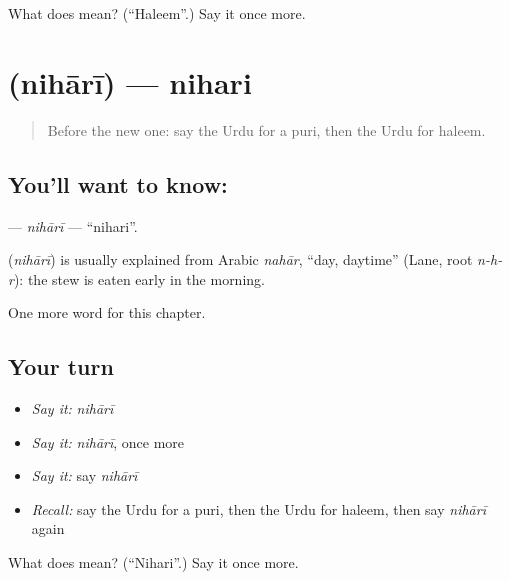 \begin{tcolorbox}[breakable,colback=teal!4,colframe=teal!35!black,title={Before you move on}]
What does  mean? (\textquotedblleft{}Haleem\textquotedblright{}.) Say it once more.
\end{tcolorbox}
\section[\texorpdfstring{\ur{نہاری} (nihārī)}{نہاری (nihārī)}]{ (nihārī) — nihari}

\label{lesson:UR-C234-nihari}



\begin{quote}
Before the new one: say the Urdu for a puri, then the Urdu for haleem.
\end{quote}

\subsection*{You'll want to know: }
\textbf{} — \emph{nihārī} — \textquotedblleft{}nihari\textquotedblright{}.

\begin{cousinweb}
\textbf{} (\emph{nihārī}) is usually explained from Arabic \emph{nahār}, \textquotedblleft{}day, daytime\textquotedblright{} (Lane, root \emph{n-h-r}): the stew is eaten early in the morning.
\end{cousinweb}

\begin{grammarlens}[title={What you've built}]
One more word for this chapter.
\end{grammarlens}

\subsection*{Your turn}
\begin{itemize}
\raggedright
  \item \emph{Say it:} \emph{nihārī}
  \item \emph{Say it:} \emph{nihārī}, once more
  \item \emph{Say it:} say \emph{nihārī}
  \item \emph{Recall:} say the Urdu for a puri, then the Urdu for haleem, then say \emph{nihārī} again
\end{itemize}

\begin{tcolorbox}[breakable,colback=teal!4,colframe=teal!35!black,title={Before you move on}]
What does  mean? (\textquotedblleft{}Nihari\textquotedblright{}.) Say it once more.
\end{tcolorbox}
